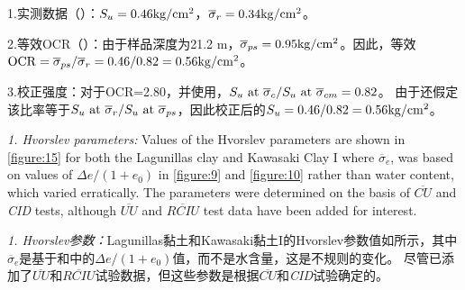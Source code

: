 \begin{paracol}{2}
    \switchcolumn

    1.实测数据（）：$S_u=0.46{\rm kg/cm^2}$，$\overline{\sigma}_r=0.34{\rm kg/cm^2}$。
    
    2.等效OCR（）：由于样品深度为21.2 m，$\overline{\sigma}_{ps}=0.95{\rm kg/cm^2}$。因此，等效${\rm OCR}=\overline{\sigma}_{ps}/\overline{\sigma}_r=0.46/0.82=0.56{\rm kg/cm^2}$。
   
    3.校正强度：对于OCR=2.80，并使用，$S_u~{\rm at}~\overline{\sigma}_c/S_u~{\rm at}~\overline{\sigma}_{cm}=0.82$。 由于还假定该比率等于$S_u~{\rm at}~\overline{\sigma}_r/S_u~{\rm at}~\overline{\sigma}_{ps}$，因此校正后的$S_u=0.46/0.82=0.56{\rm kg/cm^2}$。

\end{paracol}


\begin{paracol}{2}

    \emph{1. Hvorslev parameters:} Values of the Hvorslev parameters are shown in \autoref{figure:15} for both the Lagunillas clay and Kawasaki Clay I where $\overline{\sigma}_e$, was based on values of $\Delta{e}/(1+e_0)$ in \autoref{figure:9} and \autoref{figure:10} rather than water content, which varied erratically. The parameters were determined on the basis of $\overline{CU}$ and \emph{CID} tests, although $\overline{UU}$ and $\overline{RCIU}$ test data have been added for interest.

    \switchcolumn

    \emph{1. Hvorslev参数：}Lagunillas黏土和Kawasaki黏土I的Hvorslev参数值如所示，其中$\overline{\sigma}_e$是基于和中的$\Delta{e}/(1+e_0)$值，而不是水含量，这是不规则的变化。 尽管已添加了$\overline{UU}$和$\overline{RCIU}$试验数据，但这些参数是根据$\overline{CU}$和\emph{CID}试验确定的。

\end{paracol}





